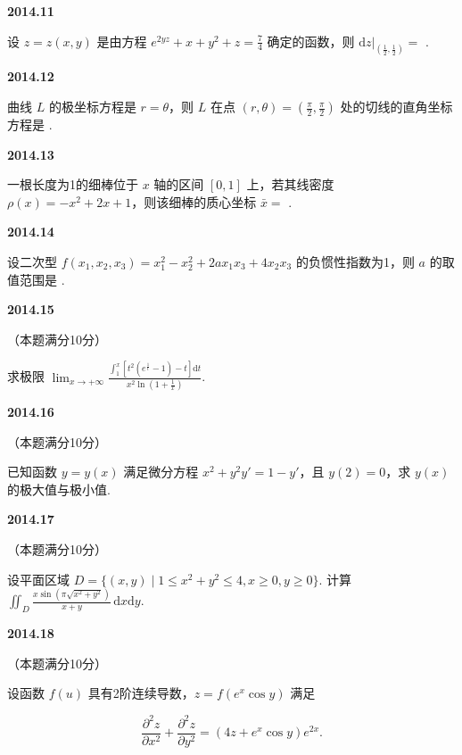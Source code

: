 \documentclass[UTF8,12pt,fontset=windows]{ctexart}
\begin{document}
\vfill
\newpage
{\large\bfseries 2014.11}

设 $z = z(x, y)$ 是由方程 $e^{2yz} + x + y^2 + z = \frac{7}{4}$ 确定的函数，则 $\left.\mathrm{d}z\right|_{\left(\frac{1}{2}, \frac{1}{2}\right)} =$ \underline{\hspace{20mm}}.

\vfill
\newpage
{\large\bfseries 2014.12}

曲线 $L$ 的极坐标方程是 $r = \theta$，则 $L$ 在点 $(r, \theta) = \left(\frac{\pi}{2}, \frac{\pi}{2}\right)$ 处的切线的直角坐标方程是 \underline{\hspace{20mm}}.

\vfill
\newpage
{\large\bfseries 2014.13}

一根长度为1的细棒位于 $x$ 轴的区间 $[0, 1]$ 上，若其线密度 $\rho(x) = -x^2 + 2x + 1$，则该细棒的质心坐标 $\bar{x} =$ \underline{\hspace{20mm}}.

\vfill
\newpage
{\large\bfseries 2014.14}

设二次型 $f(x_1, x_2, x_3) = x_1^2 - x_2^2 + 2ax_1x_3 + 4x_2x_3$ 的负惯性指数为1，则 $a$ 的取值范围是 \underline{\hspace{20mm}}.

\vfill
\newpage
{\large\bfseries 2014.15}

（本题满分10分）

求极限 $\lim_{x \to +\infty} \frac{\int_1^x \left[t^2\left(e^{\frac{1}{t}} - 1\right) - t\right]\mathrm{d}t}{x^2\ln\left(1 + \frac{1}{x}\right)}$.

\vfill
\newpage
{\large\bfseries 2014.16}

（本题满分10分）

已知函数 $y = y(x)$ 满足微分方程 $x^2 + y^2y' = 1 - y'$，且 $y(2) = 0$，求 $y(x)$ 的极大值与极小值.

\vfill
\newpage
{\large\bfseries 2014.17}

（本题满分10分）

设平面区域 $D = \{(x, y) \mid 1 \leqslant x^2 + y^2 \leqslant 4, x \geqslant 0, y \geqslant 0\}$. 计算 $\iint_D \frac{x\sin\left(\pi\sqrt{x^2 + y^2}\right)}{x + y}\,\mathrm{d}x\mathrm{d}y$.

\vfill
\newpage
{\large\bfseries 2014.18}

（本题满分10分）

设函数 $f(u)$ 具有2阶连续导数，$z = f(e^x \cos y)$ 满足

$$\frac{\partial^2 z}{\partial x^2} + \frac{\partial^2 z}{\partial y^2} = \left(4z + e^x \cos y\right)e^{2x}.$$
\end{document}
